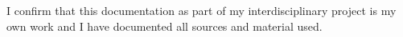 	I confirm that this documentation as part of my interdisciplinary project is my own work and I have documented all sources and material used.
	
{}